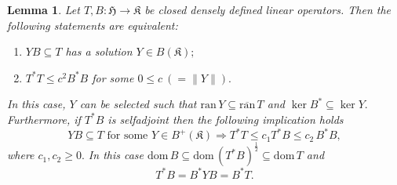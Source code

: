 \documentclass{amsart}
\newtheorem{lemma}[theorem]{Lemma}
\newcommand{\n}{\|}
\newcommand{\h}{\mathfrak{H}}
\newcommand{\kk}{\mathfrak{K}}
\newcommand{\ran}{\mathrm{ran}\,}
\newcommand{\ranbarT}{\mathrm{\overline{ran}}\, T}
\newcommand{\bk}{B(\kk)}
\newcommand{\D}{\mathrm{dom}\,}
\newcommand{\DT}{\mathrm{dom}\,T }
\newcommand{\DB}{\mathrm{dom}\,B }
\newcommand{\adj}{^*}
\newcommand{\tstar}{T^{*}}
\newcommand{\halftsb}{( T^*B)^{\frac{1}{2}}}
\newcommand{\inclu}{\subseteq}
\newcommand{\lplusk}{B^{+}(\kk)}
\numberwithin{equation}{section}
\renewcommand{\labelenumi}{(\arabic{enumi})}
\begin{document}
\begin{lemma} \label{lemprepthe}
Let $T,B:\h \rightarrow \kk $ be closed densely defined linear operators.  Then the following statements  are equivalent:
   \begin{enumerate}\def\labelenumi{\rm(\roman{enumi})}
     \item $Y B \inclu T$ has a solution $Y \in \bk;$
   \item   $T^* T  \leq c^2 B\adj B$  for some $0 \leq c \ (  =\n Y\n).$
      \end{enumerate}
     In this case, $Y$ can be selected such that $\ran Y \inclu \ranbarT$ and $\ker B\adj \inclu \ker Y.$ Furthermore,  if $\tstar B$ is selfadjoint then the following implication holds
      \begin{equation}\label{darkness1}
       Y B \inclu T  \text{ for some } Y \in \lplusk \Rightarrow T^* T  \leq  c_1  \tstar B \leq c_2 \, B\adj B,
      \end{equation}
       where $c_1,c_2 \geq 0.$
     In this case $\DB \inclu \D \halftsb \inclu  \DT$ and
       \begin{equation}\label{darkness2}
       \tstar B= B\adj Y B = B\adj T.
      \end{equation}
\end{lemma}
\end{document}
